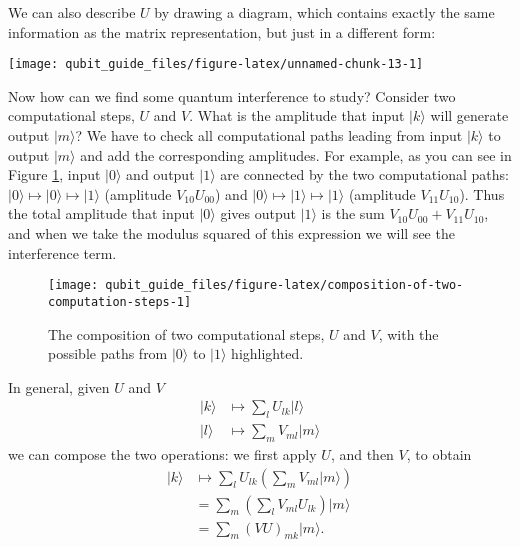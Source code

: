 \documentclass[fleqn]{article}
\begin{document}
We can also describe \(U\) by drawing a diagram, which contains exactly the same information as the matrix representation, but just in a different form:

\begin{center}\texttt{[image: qubit\_guide\_files/figure-latex/unnamed-chunk-13-1]} \end{center}

Now how can we find some quantum interference to study?
Consider two computational steps, \(U\) and \(V\).
What is the amplitude that input \(|k\rangle\) will generate output \(|m\rangle\)?
We have to check all computational paths leading from input \(|k\rangle\) to output \(|m\rangle\) and add the corresponding amplitudes.
For example, as you can see in Figure \ref{fig:composition-of-two-computation-steps}, input \(|0\rangle\) and output \(|1\rangle\) are connected by the two computational paths: \(|0\rangle\mapsto|0\rangle\mapsto|1\rangle\) (amplitude \(V_{10}U_{00}\)) and \(|0\rangle\mapsto|1\rangle\mapsto|1\rangle\) (amplitude \(V_{11}U_{10}\)).
Thus the total amplitude that input \(|0\rangle\) gives output \(|1\rangle\) is the sum \(V_{10}U_{00}+V_{11}U_{10}\), and when we take the modulus squared of this expression we will see the interference term.



\begin{figure}[H]

{\centering \texttt{[image: qubit\_guide\_files/figure-latex/composition-of-two-computation-steps-1]} 

}

\caption{The composition of two computational steps, \(U\) and \(V\), with the possible paths from \(|0\rangle\) to \(|1\rangle\) highlighted.}\label{fig:composition-of-two-computation-steps}
\end{figure}

In general, given \(U\) and \(V\)
\[
  \begin{aligned}
    |k\rangle
    &\longmapsto
    \sum_l U_{lk}|l\rangle
  \\|l\rangle
    &\longmapsto
    \sum_m V_{ml}|m\rangle
  \end{aligned}
\]
we can compose the two operations: we first apply \(U\), and then \(V\), to obtain
\[
  \begin{aligned}
    |k\rangle
    &\longmapsto
    \sum_l U_{lk} \left(
      \sum_m V_{ml}|m\rangle
    \right)
  \\&=
    \sum_m \left(
      \sum_l V_{ml}U_{lk}
    \right) |m\rangle
  \\&=
    \sum_m (VU)_{mk} |m\rangle.
  \end{aligned}
\]
\end{document}
